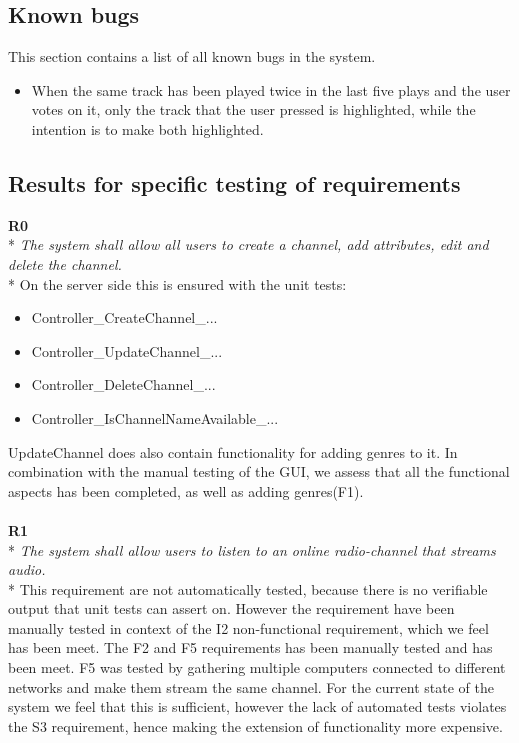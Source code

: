 \documentclass[a4paper,11pt,report]{article}
\begin{document}
\subsection{Known bugs}
This section contains a list of all known bugs in the system.
\begin{itemize}
\item When the same track has been played twice in the last five plays and the user votes on it, only the track that the user pressed is highlighted, while the intention is to make both highlighted.
\end{itemize}

\subsection{Results for specific testing of requirements}
\textbf{R0} \\*
\textit{The system shall allow all users to create a channel, add attributes, edit and delete the channel.} \\*
On the server side this is ensured with the unit tests:
\begin{itemize}
\item Controller\_CreateChannel\_...
\item Controller\_UpdateChannel\_...
\item Controller\_DeleteChannel\_...
\item Controller\_IsChannelNameAvailable\_...
\end{itemize}
UpdateChannel does also contain functionality for adding genres to it. In combination with the manual testing of the GUI, we assess that all the functional aspects has been completed, as well as adding genres(F1).\\ \\
\textbf{R1} \\*
\textit{The system shall allow users to listen to an online radio-channel that streams audio.} \\*
This requirement are not automatically tested, because there is no verifiable output that unit tests can assert on. However the requirement have been manually tested in context of the I2 non-functional requirement, which we feel has been meet. The F2 and F5 requirements has been manually tested and has been meet. F5 was tested by gathering multiple computers connected to different networks and make them stream the same channel. For the current state of the system we feel that this is sufficient, however the lack of automated tests violates the S3 requirement, hence making the extension of functionality more expensive. \\ \\
\end{document}

